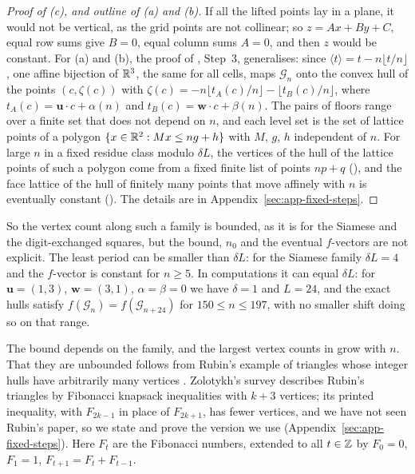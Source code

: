 \begin{proof}[Proof of (c), and outline of (a) and (b)]
If all the lifted points lay in a plane, it would not be vertical, as the grid points are not collinear; so $z=Ax+By+C$, equal row sums give $B=0$, equal column sums $A=0$, and then $z$ would be constant.
For (a) and (b), the proof of , Step~3, generalises: since $\langle t\rangle=t-n\lfloor t/n\rfloor$, one affine bijection of $\mathbb{R}^3$, the same for all cells, maps $\mathcal G_n$ onto the convex hull of the points $(c,\zeta(c))$ with $\zeta(c)=-n\lfloor t_A(c)/n\rfloor-\lfloor t_B(c)/n\rfloor$, where $t_A(c)=\mathbf u\cdot c+\alpha(n)$ and $t_B(c)=\mathbf w\cdot c+\beta(n)$.
The pairs of floors range over a finite set that does not depend on $n$, and each level set is the set of lattice points of a polygon $\{x\in\mathbb{R}^2:Mx\le ng+h\}$ with $M$, $g$, $h$ independent of $n$.
For large $n$ in a fixed residue class modulo $\delta L$, the vertices of the hull of the lattice points of such a polygon come from a fixed finite list of points $np+q$ (), and the face lattice of the hull of finitely many points that move affinely with $n$ is eventually constant ().
The details are in Appendix~\ref{sec:app-fixed-steps}.
\end{proof}

So the vertex count along such a family is bounded, as it is for the Siamese and the digit-exchanged squares, but the bound, $n_0$ and the eventual $f$-vectors are not explicit.
The least period can be smaller than $\delta L$: for the Siamese family $\delta L=4$ and the $f$-vector is constant for $n\ge5$.
In computations it can equal $\delta L$: for $\mathbf u=(1,3)$, $\mathbf w=(3,1)$, $\alpha=\beta=0$ we have $\delta=1$ and $L=24$, and the exact hulls satisfy $f(\mathcal G_n)=f(\mathcal G_{n+24})$ for $150\le n\le197$, with no smaller shift doing so on that range.

The bound depends on the family, and the largest vertex counts in  grow with $n$.
That they are unbounded follows from Rubin's example of triangles whose integer hulls have arbitrarily many vertices \cite{rubin1970}.
Zolotykh's survey \cite[Sect.~3]{zolotykh2006vertices} describes Rubin's triangles by Fibonacci knapsack inequalities with $k+3$ vertices; its printed inequality, with $F_{2k-1}$ in place of $F_{2k+1}$, has fewer vertices, and we have not seen Rubin's paper, so we state and prove the version we use (Appendix~\ref{sec:app-fixed-steps}).
Here $F_t$ are the Fibonacci numbers, extended to all $t\in\mathbb{Z}$ by $F_0=0$, $F_1=1$, $F_{t+1}=F_t+F_{t-1}$.

